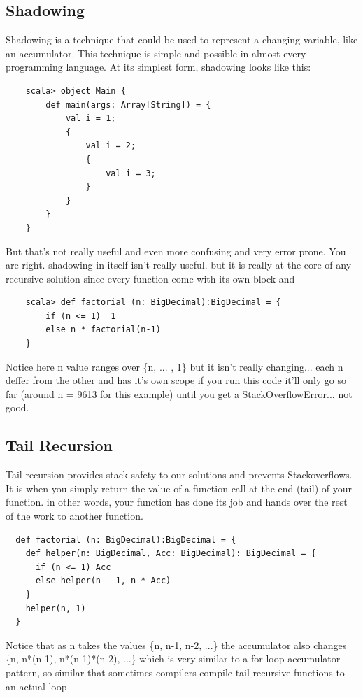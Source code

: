 \documentclass[12pt,twoside]{article}
\begin{document}
\subsection{Shadowing}

Shadowing is a technique that could be used to represent a changing variable, like an accumulator. This technique is simple and possible in almost every programming language.
At its simplest form, shadowing looks like this:
\begin{lstlisting}
    scala> object Main {
        def main(args: Array[String]) = {
            val i = 1;
            {
                val i = 2;
                {
                    val i = 3;
                }
            }
        }  
    }    
\end{lstlisting}
But that's not really useful and even more confusing and very error prone. You are right. shadowing in itself isn't really useful. but it is really at the core of any recursive solution since every function come with its own block and 
\begin{lstlisting} 
    scala> def factorial (n: BigDecimal):BigDecimal = {
        if (n <= 1)  1
        else n * factorial(n-1)
    }
\end{lstlisting}
Notice here n value ranges over \{n, ... , 1\} but it isn't really changing... each n deffer from the other and has it's own scope
if you run this code it'll only go so far (around  n = 9613 for this example) until you get a StackOverflowError... not good.




\subsection{Tail Recursion}
Tail recursion provides stack safety to our solutions and prevents Stackoverflows. It is when you simply return the value of a function call at the end (tail) of your function. in other words, your function has done its job and hands over the rest of the work to another function.
\begin{lstlisting}
  def factorial (n: BigDecimal):BigDecimal = {
    def helper(n: BigDecimal, Acc: BigDecimal): BigDecimal = {
      if (n <= 1) Acc
      else helper(n - 1, n * Acc)
    }
    helper(n, 1)
  }
\end{lstlisting}
Notice that as n takes the values \{n, n-1, n-2, ...\}
the accumulator also changes \{n, n*(n-1), n*(n-1)*(n-2), ...\}
which is very similar to a for loop accumulator pattern, so similar that sometimes compilers compile tail recursive functions to an actual loop
\end{document}
